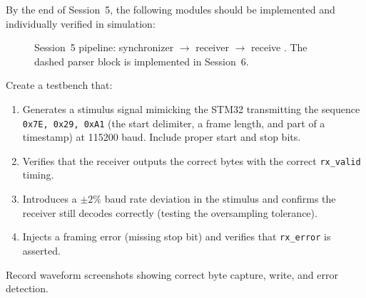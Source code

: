 \documentclass[11pt,letterpaper]{article}
\begin{document}
	By the end of Session~5, the following modules should be implemented and individually verified in simulation:

	\begin{figure}[ht!]
		\centering
		\caption{Session~5 pipeline: synchronizer $\rightarrow$ \UART{} receiver $\rightarrow$ receive \FIFO{}. The dashed parser block is implemented in Session~6.}
		\label{fig:session5_pipeline}
	\end{figure}

	\begin{tcolorbox}[infobox={Exercise: \UART{} Receiver Simulation}]
		Create a \VHDL{} testbench that:
		\begin{enumerate}
			\item Generates a stimulus signal mimicking the STM32 transmitting the sequence \texttt{0x7E, 0x29, 0xA1} (the start delimiter, a frame length, and part of a timestamp) at 115200 baud. Include proper start and stop bits.
			\item Verifies that the \UART{} receiver outputs the correct bytes with the correct \texttt{rx\_valid} timing.
			\item Introduces a $\pm 2\%$ baud rate deviation in the stimulus and confirms the receiver still decodes correctly (testing the oversampling tolerance).
			\item Injects a framing error (missing stop bit) and verifies that \texttt{rx\_error} is asserted.
		\end{enumerate}
		Record waveform screenshots showing correct byte capture, \FIFO{} write, and error detection.
	\end{tcolorbox}
\end{document}
